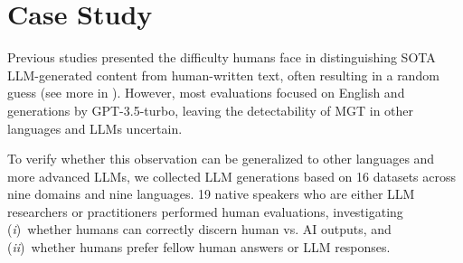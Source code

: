 \section{Case Study}
\label{sec:data-annotation}

Previous studies presented the difficulty humans face in distinguishing SOTA LLM-generated content from human-written text, often resulting in a random guess (see more in ). However, most evaluations focused on English and generations by GPT-3.5-turbo, leaving the detectability of MGT in other languages and LLMs uncertain.

To verify whether this observation can be generalized to other languages and more advanced LLMs, we collected LLM generations based on 16 datasets across nine domains and nine languages. 19 native speakers who are either LLM researchers or practitioners performed human evaluations, investigating (\emph{i})~whether humans can correctly discern human vs. AI outputs, and (\emph{ii})~whether humans prefer fellow human answers or LLM responses.


